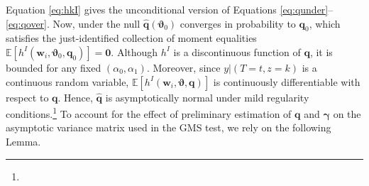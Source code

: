 Equation \ref{eq:hkI} gives the unconditional version of Equations \ref{eq:qunder}--\ref{eq:qover}.
Now, under the null $\widehat{\mathbf{q}}(\boldsymbol{\vartheta}_0)$ converges in probability to $\mathbf{q}_0$, which satisfies the just-identified collection of moment equalities $\mathbb{E}[h^I(\mathbf{w}_i, \boldsymbol{\vartheta}_0,\mathbf{q}_0)] = \mathbf{0}$.
Although $h^I$ is a discontinuous function of $\mathbf{q}$, it is bounded for any fixed $(\alpha_0, \alpha_1)$.
Moreover, since $y|(T=t,z=k)$ is a continuous random variable, $\mathbb{E}[h^I(\mathbf{w}_i,\boldsymbol{\vartheta}, \mathbf{q})]$ is continuously differentiable with respect to $\mathbf{q}$.
Hence, $\widehat{\mathbf{q}}$ is asymptotically normal under mild regularity conditions.\footnote{}
To account for the effect of preliminary estimation of $\mathbf{q}$ and $\boldsymbol{\gamma}$ on the asymptotic variance matrix used in the GMS test, we rely on the following Lemma.

